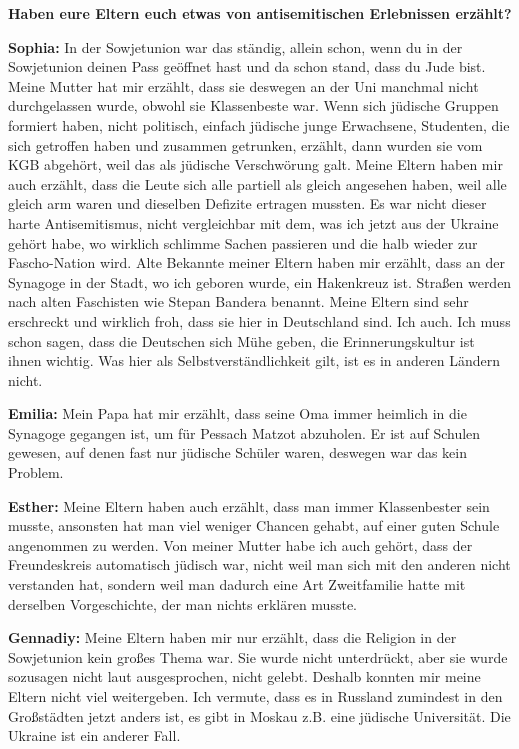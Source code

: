 \textbf{Haben eure Eltern euch etwas von antisemitischen Erlebnissen erzählt?}\par                                                 \textbf{Sophia:} In der Sowjetunion war das ständig, allein schon, wenn du in der Sowjetunion deinen Pass geöffnet hast und da schon stand, dass du Jude bist. Meine Mutter hat mir erzählt, dass sie deswegen an der Uni manchmal nicht durchgelassen wurde, obwohl sie Klassenbeste war. Wenn sich jüdische Gruppen formiert haben, nicht politisch, einfach jüdische junge Erwachsene, Studenten, die sich getroffen haben und zusammen getrunken, erzählt, dann wurden sie vom KGB abgehört, weil das als jüdische Verschwörung galt. Meine Eltern haben mir auch erzählt, dass die Leute sich alle partiell als gleich angesehen haben, weil alle gleich arm waren und dieselben Defizite ertragen mussten. Es war nicht dieser harte Antisemitismus, nicht vergleichbar mit dem, was ich jetzt aus der Ukraine gehört habe, wo wirklich schlimme Sachen passieren und die halb wieder zur Fascho-Nation wird. Alte Bekannte meiner Eltern haben mir erzählt, dass an der Synagoge in der Stadt, wo ich geboren wurde, ein Hakenkreuz ist. Straßen werden nach alten Faschisten wie Stepan Bandera benannt. Meine Eltern sind sehr erschreckt und wirklich froh, dass sie hier in Deutschland sind. Ich auch. Ich muss schon sagen, dass die Deutschen sich Mühe geben, die Erinnerungskultur ist ihnen wichtig. Was hier als Selbstverständlichkeit gilt, ist es in anderen Ländern nicht. 

\textbf{Emilia:} Mein Papa hat mir erzählt, dass seine Oma immer heimlich in die Synagoge gegangen ist, um für Pessach Matzot abzuholen. Er ist auf Schulen gewesen, auf denen fast nur jüdische Schüler waren, deswegen war das kein Problem.  

\textbf{Esther:} Meine Eltern haben auch erzählt, dass man immer Klassenbester sein musste, ansonsten hat man viel weniger Chancen gehabt, auf einer guten Schule angenommen zu werden. Von meiner Mutter habe ich auch gehört, dass der Freundeskreis automatisch jüdisch war, nicht weil man sich mit den anderen nicht verstanden hat, sondern weil man dadurch eine Art Zweitfamilie hatte mit derselben Vorgeschichte, der man nichts erklären musste. 

\textbf{Gennadiy:} Meine Eltern haben mir nur erzählt, dass die Religion in der Sowjetunion kein großes Thema war. Sie wurde nicht unterdrückt, aber sie wurde sozusagen nicht laut ausgesprochen, nicht gelebt. Deshalb konnten mir meine Eltern nicht viel weitergeben. Ich vermute, dass es in Russland zumindest in den Großstädten jetzt anders ist, es gibt in Moskau z.B. eine jüdische Universität. Die Ukraine ist ein anderer Fall.  

